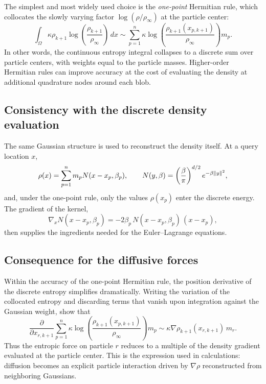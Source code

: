 \documentclass[11pt,a4paper]{article}
\begin{document}
The simplest and most widely used choice is the \emph{one-point} Hermitian rule, which collocates the slowly varying factor $\log(\rho/\rho_\infty)$ at the particle center:
\begin{equation}
\int_{\Omega}
\kappa \rho_{k+1}\log\!\left(\frac{\rho_{k+1}}{\rho_\infty}\right)\,dx
\sim
\sum_{p=1}^{n}
\kappa \log\!\left(\frac{\rho_{k+1}(x_{p,k+1})}{\rho_\infty}\right)m_p.
\end{equation}
In other words, the continuous entropy integral collapses to a discrete sum over particle centers, with weights equal to the particle masses. Higher-order Hermitian rules can improve accuracy at the cost of evaluating the density at additional quadrature nodes around each blob.

\subsection{Consistency with the discrete density evaluation}
The same Gaussian structure is used to reconstruct the density itself. At a query location $x$,
\begin{equation}
\rho(x)=\sum_{p=1}^{n} m_p N(x-x_p,\beta_p),
\qquad
N(y,\beta)=\left(\frac{\beta}{\pi}\right)^{d/2}e^{-\beta\norm{y}^2},
\end{equation}
and, under the one-point rule, only the values $\rho(x_p)$ enter the discrete energy. The gradient of the kernel,
\begin{equation}
\nabla_x N(x-x_p,\beta_p)=-2\beta_p\,N(x-x_p,\beta_p)\,(x-x_p),
\end{equation}
then supplies the ingredients needed for the Euler--Lagrange equations.

\subsection{Consequence for the diffusive forces}
Within the accuracy of the one-point Hermitian rule, the position derivative of the discrete entropy simplifies dramatically. Writing the variation of the collocated entropy and discarding terms that vanish upon integration against the Gaussian weight, \citet{pandolfi2023} show that
\begin{equation}
\frac{\partial}{\partial x_{r,k+1}}
\sum_{p=1}^{n}
\kappa \log\!\left(\frac{\rho_{k+1}(x_{p,k+1})}{\rho_\infty}\right)m_p
\sim
\kappa \nabla\rho_{k+1}(x_{r,k+1})\,m_r.
\end{equation}
Thus the entropic force on particle $r$ reduces to a multiple of the density gradient evaluated at the particle center. This is the expression used in calculations: diffusion becomes an explicit particle interaction driven by $\nabla\rho$ reconstructed from neighboring Gaussians.
\end{document}

